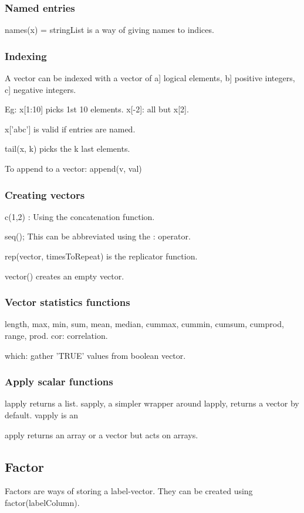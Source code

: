 \documentclass[oneside, article]{memoir}
\begin{document}
\subsubsection{Named entries}
names(x) = stringList is a way of giving names to indices.

\subsubsection{Indexing}
A vector can be indexed with a vector of a] logical elements, b] positive integers, c] negative integers.

Eg: x[1:10] picks 1st 10 elements. x[-2]: all but x[2].

x['abc'] is valid if entries are named.

tail(x, k) picks the k last elements.

To append to a vector: append(v, val)

\subsubsection{Creating vectors}
c(1,2) : Using the concatenation function.

seq(); This can be abbreviated using the : operator.

rep(vector, timesToRepeat) is the replicator function.

vector() creates an empty vector.

\subsubsection{Vector statistics functions}
length, max, min, sum, mean, median, cummax, cummin, cumsum, cumprod, range, prod. cor: correlation.

which: gather 'TRUE' values from boolean vector.

\subsubsection{Apply scalar functions}
lapply returns a list. sapply, a simpler wrapper around lapply, returns a vector by default. vapply is an

apply returns an array or a vector but acts on arrays.

\subsection{Factor}
Factors are ways of storing a label-vector. They can be created using factor(labelColumn).
\end{document}
